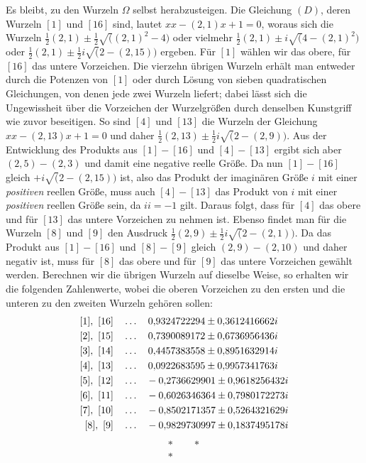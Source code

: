 Es bleibt, zu den Wurzeln \(\Omega\) selbst herabzusteigen. Die Gleichung \((D)\), deren Wurzeln \([1]\) und \([16]\) sind, lautet \(xx-(2,1)x+1=0\), woraus sich die Wurzeln \(\frac12(2,1)\pm\frac12\surd((2,1)^2-4)\) oder vielmehr \(\frac12(2,1)\pm i\surd(4-(2,1)^2)\) oder \(\frac12(2,1)\pm\frac12i\surd(2-(2,15))\) ergeben. Für \([1]\) wählen wir das obere, für \([16]\) das untere Vorzeichen. Die vierzehn übrigen Wurzeln erhält man entweder durch die Potenzen von \([1]\) oder durch Lösung von sieben quadratischen Gleichungen, von denen jede zwei Wurzeln liefert; dabei lässt sich die Ungewissheit über die Vorzeichen der Wurzelgrößen durch denselben Kunstgriff wie zuvor beseitigen. So sind \([4]\) und \([13]\) die Wurzeln der Gleichung \(xx-(2,13)x+1=0\) und daher \(\frac12(2,13)\pm\frac12i\surd(2-(2,9))\). Aus der Entwicklung des Produkts aus \([1]-[16]\) und \([4]-[13]\) ergibt sich aber \((2,5)-(2,3)\) und damit eine negative reelle Größe. Da nun \([1]-[16]\) gleich \(+i\surd(2-(2,15))\) ist, also das Produkt der imaginären Größe \(i\) mit einer \textit{positiven} reellen Größe, muss auch \([4]-[13]\) das Produkt von \(i\) mit einer \textit{positiven} reellen Größe sein, da \(ii=-1\) gilt. Daraus folgt, dass für \([4]\) das obere und für \([13]\) das untere Vorzeichen zu nehmen ist. Ebenso findet man für die Wurzeln \([8]\) und \([9]\) den Ausdruck \(\frac12(2,9)\pm\frac12i\surd(2-(2,1))\). Da das Produkt aus \([1]-[16]\) und \([8]-[9]\) gleich \((2,9)-(2,10)\) und daher negativ ist, muss für \([8]\) das obere und für \([9]\) das untere Vorzeichen gewählt werden. Berechnen wir die übrigen Wurzeln auf dieselbe Weise, so erhalten wir die folgenden Zahlenwerte, wobei die oberen Vorzeichen zu den ersten und die unteren zu den zweiten Wurzeln gehören sollen:
\[\begin{aligned}\relax[1],\ [16]&\quad\ldots\quad 0{,}9324722294\pm 0{,}3612416662i\\\relax [2],\ [15]&\quad\ldots\quad 0{,}7390089172\pm 0{,}6736956436i\\\relax [3],\ [14]&\quad\ldots\quad 0{,}4457383558\pm 0{,}8951632914i\\\relax [4],\ [13]&\quad\ldots\quad 0{,}0922683595\pm 0{,}9957341763i\\\relax [5],\ [12]&\quad\ldots\quad -0{,}2736629901\pm 0{,}9618256432i\\\relax [6],\ [11]&\quad\ldots\quad -0{,}6026346364\pm 0{,}7980172273i\\\relax [7],\ [10]&\quad\ldots\quad -0{,}8502171357\pm 0{,}5264321629i\\\relax [8],\ [9]&\quad\ldots\quad -0{,}9829730997\pm 0{,}1837495178i\end{aligned}\] \[\begin{matrix}*\qquad *\\{}*\end{matrix}\]

